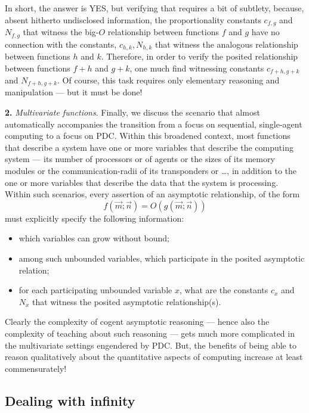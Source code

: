 In short, the answer is YES, but verifying that requires a bit of
subtlety, because, absent hitherto undisclosed information, the
proportionality constants $c_{f,g}$ and $N_{f,g}$ that witness the
big-$O$ relationship between functions $f$ and $g$ have no connection
with the constants, $c_{h,k}, N_{h,k}$ that witness the analogous
relationship between functions $h$ and $k$.  Therefore, in order to
verify the posited relationship between functions $f + h$ and $g + k$,
one much find witnessing constants $c_{f+h, g+k}$ and $N_{f+h,g+k}$.
Of course, this task requires only elementary reasoning and
manipulation --- but it must be done!

{\bf 2.}
{\em Multivariate functions}.
%
Finally, we discuss the scenario that almost automatically accompanies
the transition from a focus on sequential, single-agent computing to a
focus on PDC.  Within this broadened context, most functions that
describe a system have one or more variables that describe the
computing system --- its number of processors or of agents or the
sizes of its memory modules or the communication-radii of its
transponders or \ldots, in addition to the one or more variables that
describe the data that the system is processing.  Within such
scenarios, every assertion of an asymptotic relationship, of the form
\[ f(\vec{m}; \vec{n}) = O(g(\vec{m}; \vec{n})) \]
must explicitly specify the following information:
\begin{itemize}
\item
which variables can grow without bound;
\item
among such unbounded variables, which participate in the posited
asymptotic relation;
\item
for each participating unbounded variable $x$, what are the constants
$c_x$ and $N_x$ that witness the posited asymptotic relationship(s).
\end{itemize}

Clearly the complexity of cogent asymptotic reasoning --- hence also
the complexity of teaching about such reasoning --- gets much more
complicated in the multivariate settings engendered by PDC.  But, the
benefits of being able to reason qualitatively about the quantitative
aspects of computing increase at least commensurately!

\subsection{Dealing with infinity}
\label{subsec:infinity}

